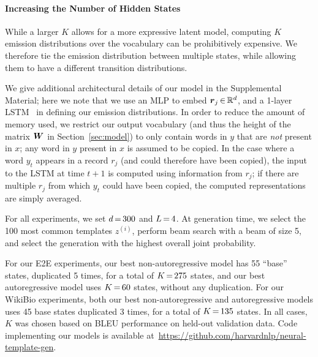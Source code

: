 \documentclass[11pt,a4paper]{article}
\begin{document}
\vspace{-0.1cm}
\paragraph{Increasing the Number of Hidden States}
While a larger $K$ allows for a more expressive latent model, computing $K$ emission distributions over the vocabulary can be prohibitively expensive. We therefore tie the emission distribution between multiple 
states, while allowing them to have a different transition distributions. 


\vspace{0.15cm}
We give additional architectural details of our model in the Supplemental Material; here we note that we use an MLP to embed $\boldsymbol{r}_j \, {\in} \, \mathbb{R}^d$, and a 1-layer LSTM~\citep{hochreiter1997lstm} in defining our emission distributions. In order to reduce the amount of memory used, we restrict our output vocabulary (and thus the height of the matrix $\boldsymbol{W}$ in Section~\ref{sec:model}) to only contain words in $y$ that are \textit{not} present in $x$; any word in $y$ present in $x$ is assumed to be copied. In the case where a word $y_t$ appears in a record $r_j$ (and could therefore have been copied), the input to the LSTM at time $t+1$ is computed using information from $r_j$; if there are multiple $r_j$ from which $y_t$ could have been copied, the computed representations are simply averaged. 


For all experiments, we set $d \, {=} \, 300$ and $L \, {=} \, 4$. At generation time, we select the 100 most common templates $z^{(i)}$, perform beam search with a beam of size 5, and select the generation with the highest overall joint probability. 

For our E2E experiments, our best non-autoregressive model has 55 ``base'' states, duplicated 5 times, for a total of $K \, {=} \, 275$ states, and our best autoregressive model uses $K \, {=} \, 60$ states, without any duplication. For our WikiBio experiments, both our best non-autoregressive and autoregressive models uses 45 base states duplicated 3 times, for a total of $K \, {=} \, 135$ states. In all cases, $K$ was chosen based on BLEU performance on held-out validation data. Code implementing our models is available at~\url{https://github.com/harvardnlp/neural-template-gen}.



\end{document}
